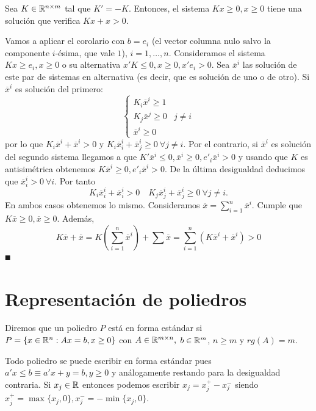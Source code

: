 \documentclass[PM.tex]{subfiles}
\begin{document}
\begin{lema}
Sea $K\in\mathbb{R}^{n\times m}$ tal que $K'=-K$. Entonces, el sistema $Kx\geq 0, x\geq 0$ tiene una solución que verifica $Kx+x>0$.
\end{lema}
\begin{dem}
Vamos a aplicar el corolario con $b=e_i$ (el vector columna nulo salvo la componente $i$-ésima, que vale $1$), $i=1,\dots, n$.
Consideramos el sistema $Kx\geq e_i, x\geq 0$ o su alternativa $x'K\leq 0, x\geq 0, x'e_i>0$. Sea $\overline{x}^i$ las solución de este par de sistemas en alternativa (es decir, que es solución de uno o de otro). Si $\overline{x}^i$ es solución del primero:
\[
\begin{cases}
K_i\overline{x}^i\geq 1 & \\
K_j\overline{x}^j\geq 0 & j\neq i\\
\overline{x}^i\geq 0 &
\end{cases}
\]
por lo que $K_i\overline{x}^i+\overline{x}^i>0$ y $ K_i\overline{x}^i_i + \overline{x}^i_j\geq 0\ \forall j\neq i$. Por el contrario, si $\overline{x}^i $ es solución del segundo sistema llegamos a que $K'\overline{x}^i\leq 0, \overline{x}^i\geq 0, e'_i\overline{x}^i>0$ y usando que $K$ es antisimétrica obtenemos $K\overline{x}^i\geq 0, e'_i\overline{x}^i>0$. De la última desigualdad deducimos que $\overline{x}^i_i> 0\ \forall i$. Por tanto
\[
K_i\overline{x}^i_i +\overline{x}^i_i>0\quad K_j\overline{x}^i_j +\overline{x}^i_j\geq 0\ \forall j\neq i.
\]
En ambos casos obtenemos lo mismo. Consideramos $\overline{x}=\sum_{i=1}^n\overline{x}^i$. Cumple que $K\overline{x}\geq 0, \overline{x}\geq 0$. Además, 
\[
K\overline{x}+\overline{x}=K(\sum_{i=1}^n\overline{x}^i)+\sum\overline{x}=\sum_{i=1}^n(K\overline{x}^i+\overline{x}^i)>0
\]
$\QED$
\end{dem}

\section{Representación de poliedros}

\begin{defi}
Diremos que un poliedro $P$ está en forma estándar si $P=\{x\in\mathbb{R}^n: Ax=b,x\geq 0\}$ con $A\in\mathbb{R}^{m\times n},$ $b\in\mathbb{R}^m$, $n\geq m$ y $rg(A)=m$.
\end{defi} 
\begin{nota}
Todo poliedro se puede escribir en forma estándar pues $a'x\leq b\equiv a'x+y=b, y\geq 0$ y análogamente restando para la desigualdad contraria.
Si $x_j\in\mathbb{R}$ entonces podemos escribir $x_j=x_j^+ -x_j^-$ siendo $x_j^+=\max{\{x_j,0\}}, x_j^-=-\min{\{x_j,0\}}$.
\end{nota}
\end{document}
